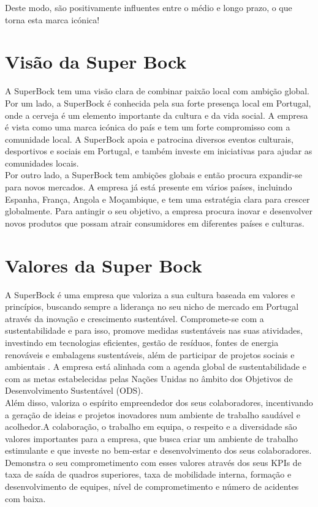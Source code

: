 Deste modo, são positivamente influentes entre o médio e longo prazo, o que torna esta marca icónica!\\ 

\section{Visão da Super Bock}

A SuperBock tem uma visão clara de combinar paixão local com ambição global. \\

Por um lado, a SuperBock é conhecida pela sua forte presença local em Portugal, onde a cerveja é um elemento importante da cultura e da vida social. A empresa é vista como uma marca icónica do país e tem um forte compromisso com a comunidade local. A SuperBock apoia e patrocina diversos eventos culturais, desportivos e sociais em Portugal, e também investe em iniciativas para ajudar as comunidades locais. \\

Por outro lado, a SuperBock tem ambições globais e então procura expandir-se para novos mercados. A empresa já está presente em vários países, incluindo Espanha, França, Angola e Moçambique, e tem uma estratégia clara para crescer globalmente. Para antingir o seu objetivo, a empresa procura inovar e desenvolver novos produtos que possam atrair consumidores em diferentes países e culturas.


\section{Valores da Super Bock}
\label{Valores}
A SuperBock é uma empresa que valoriza a sua cultura baseada em valores e princípios, buscando sempre a liderança no seu nicho de mercado em Portugal através da inovação e crescimento sustentável. Compromete-se com a sustentabilidade e para isso, promove medidas sustentáveis nas suas atividades, investindo em tecnologias eficientes, gestão de resíduos, fontes de energia renováveis e embalagens sustentáveis, além de participar de projetos sociais e ambientais \cite{ref1}.
A empresa está alinhada com a agenda global de sustentabilidade e com as metas estabelecidas pelas Nações Unidas no âmbito dos Objetivos de Desenvolvimento Sustentável (ODS)\cite{ref2}. \\

Além disso, valoriza o espírito empreendedor dos seus colaboradores, incentivando a geração de ideias e projetos inovadores num ambiente de trabalho saudável e acolhedor.A colaboração, o trabalho em equipa, o respeito e a diversidade são valores importantes para a empresa, que busca criar um ambiente de trabalho estimulante e que investe no bem-estar e desenvolvimento dos seus colaboradores\cite{ref3}. Demonstra o seu comprometimento com esses valores através dos seus KPIs de taxa de saída de quadros superiores, taxa de mobilidade interna, formação e desenvolvimento de equipes, nível de comprometimento e número de acidentes com baixa\cite{ref4}.\\

